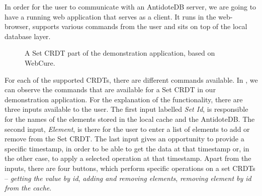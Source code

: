 In order for the user to communicate with an AntidoteDB server, we are going to have a running web application that serves as a client. It runs in the web-browser, supports various commands from the user and sits on top of the local database layer.

\begin{figure}[!htb]
    \begin{center}
    \setlength{\fboxsep}{4pt}%
    \setlength{\fboxrule}{1pt}%
    {\scriptsize}
    \caption {A Set CRDT part of the demonstration application, based on WebCure.}
    \label{fig:dev2}
\end{center}
\end{figure}
 

For each of the supported CRDTs, there are different commands available. In , we can observe the commands that are available for a Set CRDT in our demonstration application. For the explanation of the functionality, there are three inputs available to the user. The first input labelled \textit{Set Id}, is responsible for the names of the elements stored in the local cache and the AntidoteDB. The second input, \textit{Element}, is there for the user to enter a list of elements to add or remove from the Set CRDT. The last input gives an opportunity to provide a specific timestamp, in order to be able to get the data at that timestamp or, in the other case, to apply a selected operation at that timestamp. Apart from the inputs, there are four buttons, which perform specific operations on a set CRDTs -- \textit{getting the value by id}, \textit{adding and removing elements}, \textit{removing element by id from the cache}.

